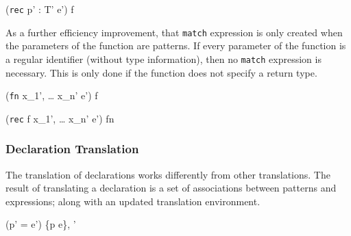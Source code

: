 \documentclass[class=article, crop=false]{standalone}
\begin{document}
  {\gamma \vdash (\texttt{rec} \; p' : T' \Rightarrow e') \Rightarrow f}


As a further efficiency improvement, that \texttt{match} expression is only created when the parameters of the function are patterns.
If every parameter of the function is a regular identifier (without type information), then no \texttt{match} expression is necessary.
This is only done if the function does not specify a return type.

\bigskip

  {\gamma \vdash (\texttt{fn} \; x_1', \; \dots \; x_n' \Rightarrow e') \Rightarrow f}

  {\gamma \vdash (\texttt{rec} \; f \; \; x_1', \; \dots \; x_n' \Rightarrow e') \Rightarrow fn}


\subsubsection{Declaration Translation}

The translation of declarations works differently from other translations.
The result of translating a declaration is a set of associations between patterns and expressions; along with an updated translation environment.

  {\gamma \vdash (p' = e') \Rightarrow \{p \rightarrow e\}, \gamma'}
\end{document}
